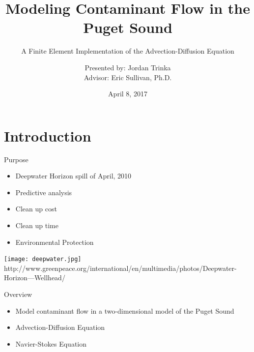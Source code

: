 \documentclass[10pt]{beamer}
\author{Presented by: Jordan Trinka\\ Advisor: Eric Sullivan, Ph.D.}
\title[Short Title]{ Modeling Contaminant Flow in the \\Puget Sound}
\subtitle{A Finite Element Implementation of the Advection-Diffusion Equation} %
\date{April 8, 2017} %
\begin{document}
\begin{frame}[t,plain]
    \titlepage
\end{frame}


\section{Introduction}

\begin{frame}{Purpose} \label{Purpose}
\begin{itemize}
\item Deepwater Horizon spill of April, 2010
\item Predictive analysis
\item Clean up cost
\item Clean up time
\item Environmental Protection
\end{itemize}

 \texttt{[image: deepwater.jpg]}
\tiny
\\
http://www.greenpeace.org/international/en/multimedia/photos/Deepwater-Horizon---Wellhead/
\normalsize
\\
\hyperlink{Questions}{}
\end{frame}

\begin{frame}{Overview}\label{Overview}

\begin{itemize}
\item Model contaminant flow in a two-dimensional model of the Puget Sound
\item Advection-Diffusion Equation
\item Navier-Stokes Equation
\end{itemize}

\end{frame}
\end{document}
